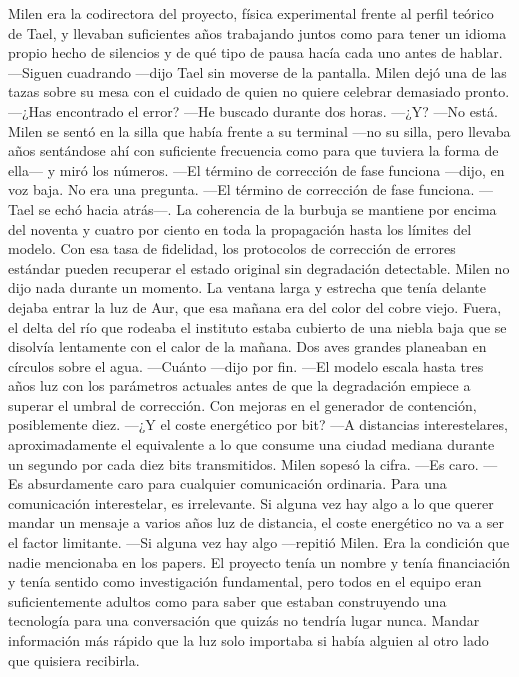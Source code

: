 \documentclass[11pt,a5paper,twoside]{book}
\begin{document}
Milen era la codirectora del proyecto, física experimental frente al perfil teórico de Tael, y llevaban suficientes años trabajando juntos como para tener un idioma propio hecho de silencios y de qué tipo de pausa hacía cada uno antes de hablar.
—Siguen cuadrando —dijo Tael sin moverse de la pantalla.
Milen dejó una de las tazas sobre su mesa con el cuidado de quien no quiere celebrar demasiado pronto.
—¿Has encontrado el error?
—He buscado durante dos horas.
—¿Y?
—No está.
Milen se sentó en la silla que había frente a su terminal —no su silla, pero llevaba años sentándose ahí con suficiente frecuencia como para que tuviera la forma de ella— y miró los números.
—El término de corrección de fase funciona —dijo, en voz baja. No era una pregunta.
—El término de corrección de fase funciona. —Tael se echó hacia atrás—. La coherencia de la burbuja se mantiene por encima del noventa y cuatro por ciento en toda la propagación hasta los límites del modelo. Con esa tasa de fidelidad, los protocolos de corrección de errores estándar pueden recuperar el estado original sin degradación detectable.
Milen no dijo nada durante un momento.
La ventana larga y estrecha que tenía delante dejaba entrar la luz de Aur, que esa mañana era del color del cobre viejo. Fuera, el delta del río que rodeaba el instituto estaba cubierto de una niebla baja que se disolvía lentamente con el calor de la mañana. Dos aves grandes planeaban en círculos sobre el agua.
—Cuánto —dijo por fin.
—El modelo escala hasta tres años luz con los parámetros actuales antes de que la degradación empiece a superar el umbral de corrección. Con mejoras en el generador de contención, posiblemente diez.
—¿Y el coste energético por bit?
—A distancias interestelares, aproximadamente el equivalente a lo que consume una ciudad mediana durante un segundo por cada diez bits transmitidos.
Milen sopesó la cifra.
—Es caro.
—Es absurdamente caro para cualquier comunicación ordinaria. Para una comunicación interestelar, es irrelevante. Si alguna vez hay algo a lo que querer mandar un mensaje a varios años luz de distancia, el coste energético no va a ser el factor limitante.
—Si alguna vez hay algo —repitió Milen.
Era la condición que nadie mencionaba en los papers. El proyecto tenía un nombre y tenía financiación y tenía sentido como investigación fundamental, pero todos en el equipo eran suficientemente adultos como para saber que estaban construyendo una tecnología para una conversación que quizás no tendría lugar nunca. Mandar información más rápido que la luz solo importaba si había alguien al otro lado que quisiera recibirla.
\end{document}
